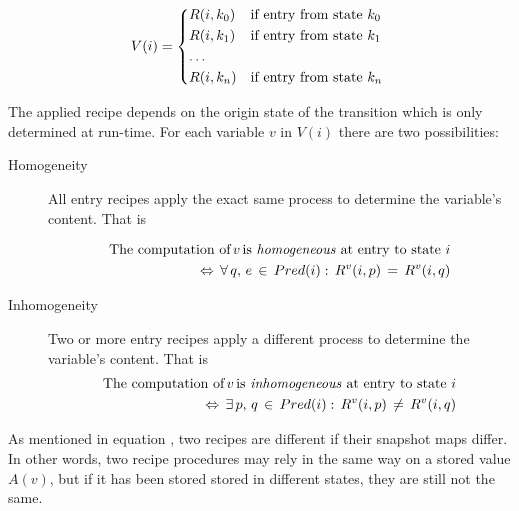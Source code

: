 \documentclass[12pt,a4paper]{scrartcl}
\begin{document}
\begin{eqnarray}
    V(i)  =  \begin{dcases*}
               R(i,k_0) &  if entry from state $k_0$ \\
               R(i,k_1) &  if entry from state $k_1$ \\
               \dots                                 \\
               R(i,k_n) &  if entry from state $k_n$
            \end{dcases*}
\end{eqnarray}

The applied recipe depends on the origin state of the transition which is only
determined at run-time.  For each variable $v$ in $V(i)$ there are two
possibilities:

\begin{description}
    \item[Homogeneity] All entry recipes apply the exact same process to
                       determine the variable's content. That is

    \begin{equation}
        \begin{aligned}
        \mbox{The computation of}\,v\,\mbox{is \textit{homogeneous} at entry to state $i$}\\
        \Leftrightarrow\,\forall\,q,\,e\,\in\,Pred(i):\,R^v(i,p)\,=\,R^v(i,q) 
        \end{aligned}
    \end{equation}

    \item[Inhomogeneity] Two or more entry recipes apply a different process
                         to determine the variable's content. That is
    \begin{equation}
        \begin{aligned}
        \mbox{The computation of}\,v\,\mbox{is \textit{inhomogeneous} at entry to state $i$}\\
        \Leftrightarrow\,\exists\,p,\,q\,\in\,Pred(i):\,R^v(i,p)\,\neq\,R^v(i,q)
        \end{aligned}
    \end{equation}
\end{description}

As mentioned in equation \label{eq:snapshot-map-difference}, two recipes are
different if their snapshot maps differ. In other words, two recipe procedures
may rely in the same way on a stored value $A(v)$, but if it has been stored
stored in different states, they are still not the same.
\end{document}

